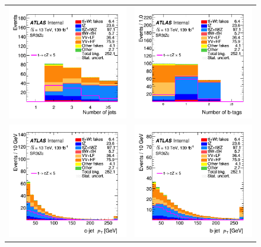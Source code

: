 \begin{figure}[htbp]
	\centering
	\begin{tabular}{cc}
		\includegraphics[width=.45\textwidth]{Chapters/CH6/figures/SR3_UsingSMT/nJets} &
	    \includegraphics[width=.45\textwidth]{Chapters/CH6/figures/SR3_UsingSMT/nbJets}\\
		\includegraphics[width=.45\textwidth]{Chapters/CH6/figures/SR3_UsingSMT/q_pt} &
		\includegraphics[width=.45\textwidth]{Chapters/CH6/figures/SR3_UsingSMT/b_pt} \\

\end{tabular}
\end{figure}
